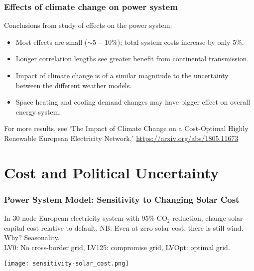 \documentclass[10pt,aspectratio=169,dvipsnames]{beamer}
\let\olditem\item
\renewcommand{\item}{%
\olditem\vspace{5pt}}
\begin{document}
\begin{frame}
  \frametitle{Effects of climate change on power system}

  Conclusions from study of effects on the power system:

    \begin{itemize}
    \item Most effects are small ($\sim 5-10\%$); total system costs increase by only 5\%.
     \item Longer correlation lengths see greater benefit from continental transmission.
     \item Impact of climate change is of a similar magnitude to the uncertainty between the different weather models.
       \item Space heating and cooling demand changes may have bigger effect on overall energy system.
    \end{itemize}

    For more results, see `The Impact of Climate Change on a Cost-Optimal Highly Renewable European Electricity Network,' \url{https://arxiv.org/abs/1805.11673}

\end{frame}





\section{Cost and Political Uncertainty}

\begin{frame}
  \frametitle{Power System Model: Sensitivity to Changing Solar Cost}

  In 30-node European electricity system with 95\% CO$_2$ reduction, change solar
  capital cost relative to default. NB: Even at zero solar cost, there
  is still wind. Why? Seasonality.\\
  LV0: No cross-border grid, LV125: compromise grid, LVOpt: optimal grid.

\centering
    \texttt{[image: sensitivity-solar\_cost.png]}

\end{frame}
\end{document}

